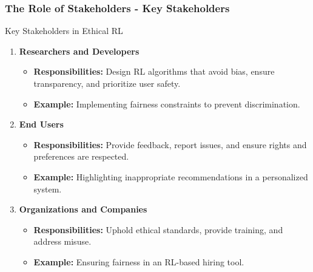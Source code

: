 \documentclass[aspectratio=169]{beamer}
\begin{document}
\begin{frame}[fragile]
    \frametitle{The Role of Stakeholders - Key Stakeholders}
    \begin{block}{Key Stakeholders in Ethical RL}
        \begin{enumerate}
            \item \textbf{Researchers and Developers}
                \begin{itemize}
                    \item \textbf{Responsibilities:} Design RL algorithms that avoid bias, ensure transparency, and prioritize user safety.
                    \item \textbf{Example:} Implementing fairness constraints to prevent discrimination.
                \end{itemize}
              
            \item \textbf{End Users}
                \begin{itemize}
                    \item \textbf{Responsibilities:} Provide feedback, report issues, and ensure rights and preferences are respected.
                    \item \textbf{Example:} Highlighting inappropriate recommendations in a personalized system.
                \end{itemize}
                
            \item \textbf{Organizations and Companies}
                \begin{itemize}
                    \item \textbf{Responsibilities:} Uphold ethical standards, provide training, and address misuse.
                    \item \textbf{Example:} Ensuring fairness in an RL-based hiring tool.
                \end{itemize}
        \end{enumerate}
    \end{block}
\end{frame}
\end{document}
